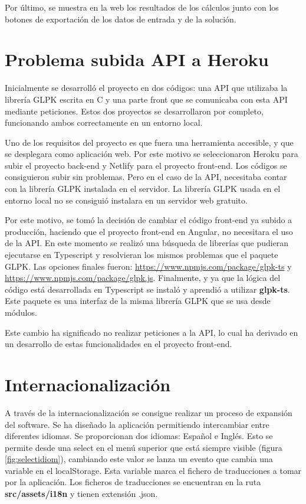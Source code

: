 Por último, se muestra en la web los resultados de los cálculos junto con los botones de exportación de los datos de entrada y de la solución. 

\section{Problema subida API a Heroku}

Inicialmente se desarrolló el proyecto en dos códigos: una API que utilizaba la librería GLPK escrita en C y una parte front que se comunicaba con esta API mediante peticiones. Estos dos proyectos se desarrollaron por completo, funcionando ambos correctamente en un entorno local.

Uno de los requisitos del proyecto es que fuera una herramienta accesible, y que se desplegara como aplicación web. Por este motivo se seleccionaron Heroku para subir el proyecto back-end y Netlify para el proyecto front-end. Los códigos se consiguieron subir sin problemas. Pero en el caso de la API, necesitaba contar con la librería GLPK instalada en el servidor.  La librería GLPK usada en el entorno local no se consiguió instalara en un servidor web gratuito. 

Por este motivo, se tomó la decisión de cambiar el código front-end ya subido a producción, haciendo que el proyecto front-end en Angular, no necesitara el uso de la API. En este momento se realizó una búsqueda de librerías que pudieran ejecutarse en Typescript y resolvieran los mismos problemas que  el paquete GLPK. Las opciones finales fueron: \url{https://www.npmjs.com/package/glpk-ts} y \url{https://www.npmjs.com/package/glpk.js}. Finalmente, y ya que la lógica del código está desarrollada en Typescript se instaló y aprendió a utilizar \textbf{glpk-ts}. Este paquete es una interfaz de la misma librería GLPK \cite{glpk:package} que se usa desde módulos. 

Este cambio ha significado no realizar peticiones a la API, lo cual ha derivado en un desarrollo de estas funcionalidades en el proyecto front-end. 

\section{Internacionalización}

A través de la internacionalización se consigue realizar un proceso de expansión del software. Se ha diseñado la aplicación permitiendo intercambiar entre diferentes idiomas. Se proporcionan dos idiomas: Español e Inglés. Esto se permite desde una select en el menú superior que está siempre visible (figura \ref{fig:selectidiom}), cambiando este valor se lanza un evento que cambia una variable en el localStorage. Esta variable marca el fichero de traducciones a tomar por la aplicación. Los ficheros de traducciones se encuentran en la ruta \textbf{src/assets/i18n} y tienen extensión .json.

